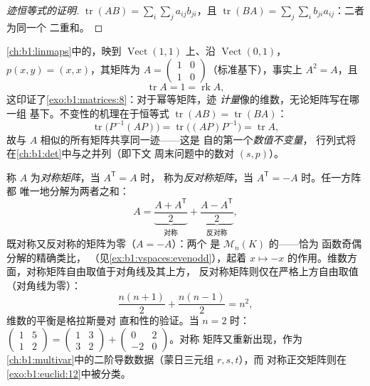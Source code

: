 \begin{proof}[迹恒等式的证明]
$\operatorname{tr}(AB) = \sum_i \sum_j a_{ij} b_{ji}$，且
$\operatorname{tr}(BA) = \sum_j \sum_i b_{ji} a_{ij}$：二者为同一个
二重和。
\end{proof}

\begin{example}[迹的应用]
\label{ex:b1:matrices:tracework}
\cref{ch:b1:linmaps}中的，映到
$\operatorname{Vect}(1,1)$ 上、沿 $\operatorname{Vect}(0,1)$，
$p(x, y) = (x, x)$，其矩阵为 $A = \begin{pmatrix} 1 & 0\\ 1 &
0\end{pmatrix}$（标准基下），事实上 $A^2 = A$，且
\[
\operatorname{tr} A = 1 = \operatorname{rk} A ,
\]
这印证了\cref{exo:b1:matrices:8}：对于幂等矩阵，迹
\emph{计量}像的维数，无论矩阵写在哪一组
基下。不变性的机理在于恒等式
$\operatorname{tr}(AB) = \operatorname{tr}(BA)$：
\[
\operatorname{tr}\bigl(P^{-1}(AP)\bigr) =
\operatorname{tr}\bigl((AP)P^{-1}\bigr) = \operatorname{tr} A ,
\]
故与 $A$ 相似的所有矩阵共享同一迹——这是
自的第一个\emph{数值不变量}，
行列式将在\cref{ch:b1:det}中与之并列（即下文
周末问题中的数对 $(s, p)$）。
\end{example}

\begin{example}[对称加反对称]
\label{ex:b1:matrices:symsplit}
称 $A$ 为\emph{对称矩阵}，当 $A^{\mathsf T} = A$ 时，
称为\emph{反对称矩阵}，当 $A^{\mathsf T} = -A$ 时。任一方阵都
唯一地分解为两者之和：
\[
A = \underbrace{\frac{A + A^{\mathsf T}}{2}}_{\text{对称}}
+ \underbrace{\frac{A - A^{\mathsf T}}{2}}_{\text{反对称}},
\]
既对称又反对称的矩阵为零（$A = -A$）：两个
是 $\mathcal{M}_n(K)$ 的——恰为
函数奇偶分解的精确类比，
（见\cref{ex:b1:vspaces:evenodd}），起着
$x \mapsto -x$ 的作用。维数方面，对称矩阵自由取值于对角线及其上方，
反对称矩阵则仅在严格上方自由取值
（对角线为零）：
\[
\frac{n(n+1)}{2} + \frac{n(n-1)}{2} = n^2 ,
\]
维数的平衡是格拉斯曼对
直和性的验证。当 $n = 2$ 时：$\begin{pmatrix} 1 & 5\\ 1 &
2\end{pmatrix} = \begin{pmatrix} 1 & 3\\ 3 & 2\end{pmatrix} +
\begin{pmatrix} 0 & 2\\ -2 & 0\end{pmatrix}$。对称
矩阵又重新出现，作为
\cref{ch:b1:multivar}中的二阶导数数据（蒙日三元组 $r, s, t$），而
对称正交矩阵则在
\cref{exo:b1:euclid:12}中被分类。
\end{example}

